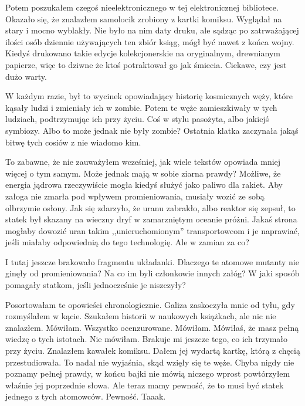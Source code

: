 Potem poszukałem czegoś nieelektronicznego w tej elektronicznej bibliotece.
Okazało się, że znalazłem samolocik zrobiony z kartki komiksu.
Wyglądał na stary i mocno wyblakły. Nie było na nim daty druku, ale sądząc po zatrważającej ilości osób dziennie używających ten zbiór ksiąg, mógł być nawet z końca wojny.
Kiedyś drukowano takie edycje kolekcjonerskie na oryginalnym, drewnianym papierze, więc to dziwne że ktoś potraktował go jak śmiecia.
Ciekawe, czy jest dużo warty.

W każdym razie, był to wycinek opowiadający historię kosmicznych węży, które kąsały ludzi i zmieniały ich w zombie.
Potem te węże zamieszkiwały w tych ludziach, podtrzymując ich przy życiu. Coś w stylu pasożyta, albo jakiejś symbiozy.
Albo to może jednak nie były zombie? 
Ostatnia klatka zaczynała jakąś bitwę tych cosiów z nie wiadomo kim.

To zabawne, że nie zauważyłem wcześniej, jak wiele tekstów  opowiada mniej więcej o tym samym. 
Może jednak mają w sobie ziarna prawdy?
Możliwe, że energia jądrowa rzeczywiście mogła kiedyś służyć jako paliwo dla rakiet.
Aby załoga nie zmarła pod wpływem promieniowania, musiały wozić ze sobą olbrzymie osłony.
Jak się zdarzyło, że uranu zabrakło, albo reaktor się zepsuł, to statek był skazany na wieczny dryf w zamarzniętym oceanie próżni.
Jakaś strona mogłaby dowozić uran takim ,,unieruchomionym'' transportowcom i je naprawiać, jeśli miałaby odpowiednią do tego technologię.
Ale w zamian za co?

I tutaj jeszcze brakowało fragmentu układanki. Dlaczego te atomowe mutanty nie ginęły od promieniowania? Na co im byli członkowie innych załóg?
W jaki sposób pomagały statkom, jeśli jednocześnie je niszczyły?

\begin{dialogue}
	\ds{} Posortowałam te opowieści chronologicznie. \dm{} Galiza zaskoczyła mnie od tyłu, gdy rozmyślałem w kącie.
	\ds{} Szukałem historii w naukowych książkach, ale nic nie znalazłem.
	\ds{} Mówiłam.
	\ds{} Wszystko ocenzurowane.
	\ds{} Mówiłam.
	\ds{} Mówiłaś, że masz pełną wiedzę o tych istotach.
	\ds{} Nie mówiłam. Brakuje mi jeszcze tego, co ich trzymało przy życiu.
	\ds{} Znalazłem kawałek komiksu. \dm{} Dałem jej wydartą kartkę, którą z chęcią przestudiowała.
	\ds{} To nadal nie wyjaśnia, skąd wzięły się te węże.
	\ds{} Chyba nigdy nie poznamy pełnej prawdy, w końcu bajki nie mówią niczego wprost \dm{} powtórzyłem właśnie jej poprzednie słowa.
	\ds{} Ale teraz mamy pewność, że to musi być statek jednego z tych atomowców.
	\ds{} Pewność. Taaak.
\end{dialogue}

